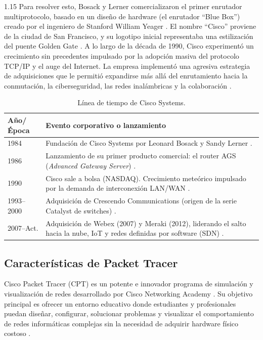 \documentclass[11pt, a4paper]{article}
\begin{document}
\begin{spacing}{1.15}
Para resolver esto, Bosack y Lerner comercializaron el primer enrutador multiprotocolo, basado en un diseño de hardware (el enrutador ``Blue Box'') creado por el ingeniero de Stanford William Yeager \cite{cisco_history}. El nombre ``Cisco'' proviene de la ciudad de San Francisco, y su logotipo inicial representaba una estilización del puente Golden Gate \cite{cisco_tech}. A lo largo de la década de 1990, Cisco experimentó un crecimiento sin precedentes impulsado por la adopción masiva del protocolo TCP/IP y el auge del Internet. La empresa implementó una agresiva estrategia de adquisiciones que le permitió expandirse más allá del enrutamiento hacia la conmutación, la ciberseguridad, las redes inalámbricas y la colaboración \cite{cisco_history}.

\begin{table}[H]
    \centering
    \renewcommand{\arraystretch}{1.35}
    \begin{tabular}{|p{2.5cm}|p{12cm}|}
        \hline
        \textbf{Año/Época} & \textbf{Evento corporativo o lanzamiento} \\ \hline
        1984 & Fundación de Cisco Systems por Leonard Bosack y Sandy Lerner \cite{cisco_history}. \\ \hline
        1986 & Lanzamiento de su primer producto comercial: el router AGS (\textit{Advanced Gateway Server}) \cite{cisco_tech}. \\ \hline
        1990 & Cisco sale a bolsa (NASDAQ). Crecimiento meteórico impulsado por la demanda de interconexión LAN/WAN \cite{cisco_history}. \\ \hline
        1993--2000 & Adquisición de Crescendo Communications (origen de la serie Catalyst de switches) \cite{cisco_tech}. \\ \hline
        2007--Act. & Adquisición de Webex (2007) y Meraki (2012), liderando el salto hacia la nube, IoT y redes definidas por software (SDN) \cite{cisco_history}. \\ \hline
    \end{tabular}
    \caption{Línea de tiempo de Cisco Systems.}
\end{table}

\subsection{Características de Packet Tracer}
Cisco Packet Tracer (CPT) es un potente e innovador programa de simulación y visualización de redes desarrollado por Cisco Networking Academy \cite{pt_docs}. Su objetivo principal es ofrecer un entorno educativo donde estudiantes y profesionales puedan diseñar, configurar, solucionar problemas y visualizar el comportamiento de redes informáticas complejas sin la necesidad de adquirir hardware físico costoso \cite{cisco_netacad}.


\end{spacing}
\end{document}
